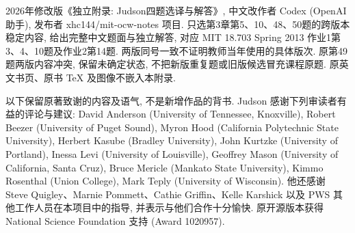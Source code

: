 2026年修改版《独立附录: Judson四题选译与解答》, 中文改作者 Codex (OpenAI助手), 发布者 xhc144/mit-ocw-notes 项目. 只选第3章第5、10、48、50题的跨版本稳定内容, 给出完整中文题面与独立解答, 对应 MIT 18.703 Spring 2013 作业1第3、4、10题及作业2第14题. 两版同号一致不证明教师当年使用的具体版次. 原第49题两版内容冲突, 保留未确定状态, 不把新版重复题或旧版候选冒充课程原题. 原英文书页、原书 TeX 及图像不嵌入本附录.

\par\addvspace{9pt}
\par
以下保留原著致谢的内容及语气, 不是新增作品的背书. Judson 感谢下列审读者有益的评论与建议: David Anderson (University of Tennessee, Knoxville), Robert Beezer (University of Puget Sound), Myron Hood (California Polytechnic State University), Herbert Kasube (Bradley University), John Kurtzke (University of Portland), Inessa Levi (University of Louisville), Geoffrey Mason (University of California, Santa Cruz), Bruce Mericle (Mankato State University), Kimmo Rosenthal (Union College), Mark Teply (University of Wisconsin). 他还感谢 Steve Quigley、Marnie Pommett、Cathie Griffin、Kelle Karshick 以及 PWS 其他工作人员在本项目中的指导, 并表示与他们合作十分愉快. 原开源版本获得 National Science Foundation 支持 (Award 1020957).
\clearpage
